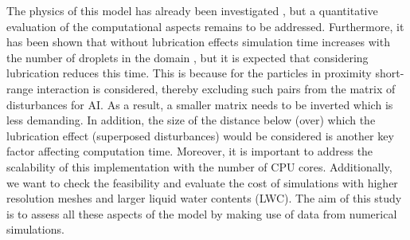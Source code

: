\documentclass[../thesis.tex]{subfiles}
\begin{document}
The physics of this model has already been investigated \cite{ARPW21}, but a quantitative evaluation of the computational aspects remains to be addressed. Furthermore, it has been shown that without lubrication effects simulation time increases with the number of droplets in the domain \cite{APCRW14}, but it is expected that considering lubrication reduces this time. This is because for the particles in proximity short-range interaction is considered, thereby excluding such pairs from the matrix of disturbances for AI. As a result, a smaller matrix needs to be inverted which is less demanding. In addition, the size of the distance below (over) which the lubrication effect (superposed disturbances) would be considered is another key factor affecting computation time. Moreover, it is important to address the scalability of this implementation with the number of CPU cores. Additionally, we want to check the feasibility and evaluate the cost of simulations with higher resolution meshes and larger liquid water contents (LWC). The aim of this study is to assess all these aspects of the model by making use of data from numerical simulations.

%
%
\newpage
\end{document}
